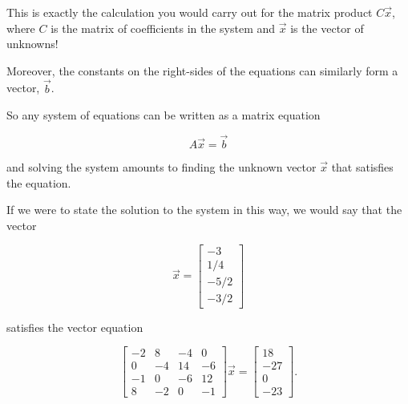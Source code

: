 \documentclass{ximera}
\begin{document}
\begin{exploration}
\begin{example}
\begin{remark}
This is exactly the calculation you would carry out for the matrix product $C\vec{x}$, where $C$ is the matrix of coefficients in the system and $\vec{x}$ is the vector of unknowns!

Moreover, the constants on the right-sides of the equations can similarly form a vector, $\vec{b}$. 

So any system of equations can be written as a matrix equation

$$A\vec{x} = \vec{b}$$

and solving the system amounts to finding the unknown vector $\vec{x}$ that satisfies the equation.

If we were to state the solution to the system in this way, we would say that the vector

$$\vec{x} = \begin{bmatrix}-3 \\ 1/4\\-5/2\\-3/2\end{bmatrix}$$

satisfies the vector equation 

$$\begin{bmatrix}-2 & 8 & -4 & 0 \\ 0 & -4 & 14 & -6 \\ -1 & 0 & -6 & 12 \\ 8 & -2 & 0 & -1\end{bmatrix}\vec{x} = \begin{bmatrix}18 \\ -27\\0\\-23\end{bmatrix}.$$


\end{remark}

\end{example}

\end{exploration}
\end{document}

